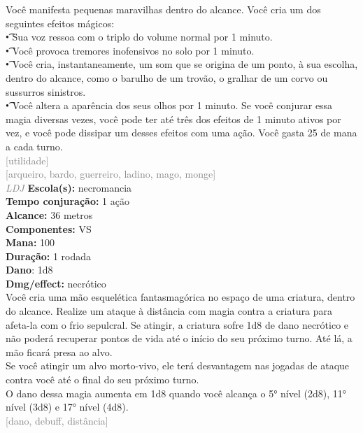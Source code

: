 \documentclass{RPG_Adventure}[2021/10/20]
\begin{document}
{\normalsize Você manifesta pequenas maravilhas dentro do alcance. Você cria um dos seguintes efeitos mágicos:\\\t • Sua voz ressoa com o triplo do volume normal por 1 minuto.\\\t • Você provoca tremores inofensivos no solo por 1 minuto.\\\t • Você cria, instantaneamente, um som que se origina de um ponto, à sua escolha, dentro do alcance, como o barulho de um trovão, o gralhar de um corvo ou sussurros sinistros.\\\t • Você altera a aparência dos seus olhos por 1 minuto.  Se você conjurar essa magia diversas vezes, você pode ter até três dos efeitos de 1 minuto ativos por vez, e você pode dissipar um desses efeitos com uma ação. Você gasta 25 de mana a cada turno.\\}
{\scriptsize \textcolor{gray}{[utilidade]\\}}
{\scriptsize \textcolor{gray}{[arqueiro, bardo, guerreiro, ladino, mago, monge]\\}}
{\tiny \textcolor{gray}{\textit{LDJ}}}\jump{}
{\small \t \textbf{Escola(s):} necromancia\\\t \textbf{Tempo conjuração:} 1 ação\\\t \textbf{Alcance:} 36 metros\\\t \textbf{Componentes:} VS\\\t \textbf{Mana:} 100\\\t \textbf{Duração:} 1 rodada\\\t \textbf{Dano}: 1d8\\\t \textbf{Dmg/effect:} necrótico\\}
{\normalsize Você cria uma mão esquelética fantasmagórica no espaço de uma criatura, dentro do alcance. Realize um ataque à distância com magia contra a criatura para afeta-la com o frio sepulcral. Se atingir, a criatura sofre 1d8 de dano necrótico e não poderá recuperar pontos de vida até o início do seu próximo turno. Até lá, a mão ficará presa ao alvo.\\Se você atingir um alvo morto-vivo, ele terá desvantagem nas jogadas de ataque contra você até o final do seu próximo turno.\\O dano dessa magia aumenta em 1d8 quando você alcança o 5° nível (2d8), 11° nível (3d8) e 17° nível (4d8).\\}
{\scriptsize \textcolor{gray}{[dano, debuff, distância]\\}}
\end{document}
